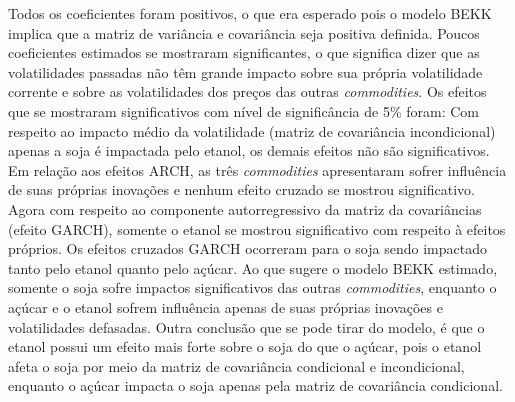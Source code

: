 Todos os coeficientes foram positivos, o que era esperado pois o modelo
BEKK implica que a matriz de variância e covariância seja positiva
definida. Poucos coeficientes estimados se mostraram significantes, o
que significa dizer que as volatilidades passadas não têm grande impacto
sobre sua própria volatilidade corrente e sobre as volatilidades dos
preços das outras \emph{commodities}. Os efeitos que se mostraram
significativos com nível de significância de 5\% foram: Com respeito ao
impacto médio da volatilidade (matriz de covariância incondicional)
apenas a soja é impactada pelo etanol, os demais efeitos não são
significativos. Em relação aos efeitos ARCH, as três \emph{commodities}
apresentaram sofrer influência de suas próprias inovações e nenhum
efeito cruzado se mostrou significativo. Agora com respeito ao
componente autorregressivo da matriz da covariâncias (efeito GARCH),
somente o etanol se mostrou significativo com respeito à efeitos
próprios. Os efeitos cruzados GARCH ocorreram para o soja sendo
impactado tanto pelo etanol quanto pelo açúcar. Ao que sugere o modelo
BEKK estimado, somente o soja sofre impactos significativos das outras
\emph{commodities}, enquanto o açúcar e o etanol sofrem influência
apenas de suas próprias inovações e volatilidades defasadas. Outra conclusão que
se pode tirar do modelo, é que o etanol possui um efeito mais forte
sobre o soja do que o açúcar, pois o etanol afeta o soja por meio da
matriz de covariância condicional e incondicional, enquanto o açúcar
impacta o soja apenas pela matriz de covariância condicional.


